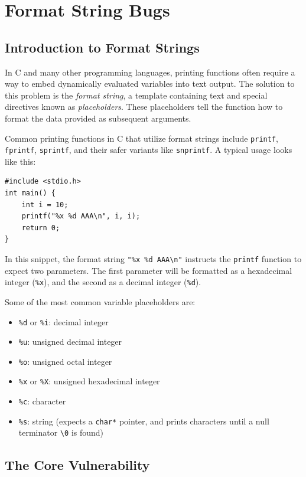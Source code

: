 \chapter{Format String Bugs}
\label{ch:format_string_bugs}


\section{Introduction to Format Strings}
In C and many other programming languages, printing functions often require a way to embed dynamically evaluated variables into text output. The solution to this problem is the \emph{format string}, a template containing text and special directives known as \emph{placeholders}. These placeholders tell the function how to format the data provided as subsequent arguments.

Common printing functions in C that utilize format strings include \texttt{printf}, \texttt{fprintf}, \texttt{sprintf}, and their safer variants like \texttt{snprintf}. A typical usage looks like this:

\begin{verbatim}
#include <stdio.h>
int main() {
    int i = 10;
    printf("%x %d AAA\n", i, i);
    return 0;
}
\end{verbatim}

In this snippet, the format string \texttt{"\%x \%d AAA\textbackslash{}n"} instructs the \texttt{printf} function to expect two parameters. The first parameter will be formatted as a hexadecimal integer (\texttt{\%x}), and the second as a decimal integer (\texttt{\%d}). 

Some of the most common variable placeholders are:
\begin{itemize}
    \item \texttt{\%d} or \texttt{\%i}: decimal integer
    \item \texttt{\%u}: unsigned decimal integer
    \item \texttt{\%o}: unsigned octal integer
    \item \texttt{\%x} or \texttt{\%X}: unsigned hexadecimal integer
    \item \texttt{\%c}: character
    \item \texttt{\%s}: string (expects a \texttt{char*} pointer, and prints characters until a null terminator \texttt{\textbackslash{}0} is found)
\end{itemize}

\section{The Core Vulnerability}

